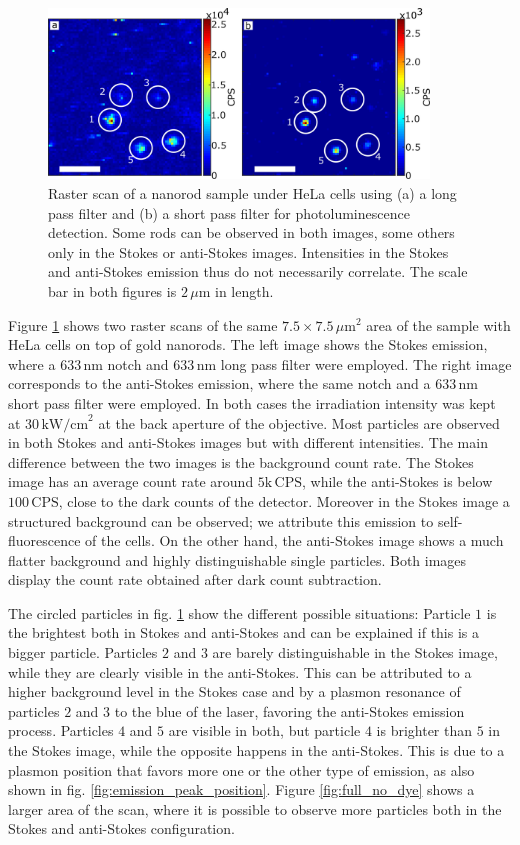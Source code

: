 \documentclass[journal=nalefd,manuscript=letter]{achemso}
\newcommand{\nm}{\ensuremath{\,\textrm{nm}}}
\newcommand{\um}{\ensuremath{\,\mu\textrm{m}}}
\newcommand{\pwr}{\ensuremath{\,\textrm{kW/cm}^2}}
\newcommand{\CPS}{\ensuremath{\,\textrm{CPS}}}
\begin{document}
\begin{figure}[htp] \centering
\includegraphics[width=0.9\textwidth]{Figures/04_Stokes_AS/stokes_as_no_dye.png}
\caption{Raster scan of a nanorod sample under HeLa cells using (a) a long pass
filter and (b) a short pass filter for photoluminescence detection.
Some rods can be observed in both images, some others only in the Stokes or
anti-Stokes images. Intensities in the Stokes and anti-Stokes emission thus do
not necessarily correlate. The scale bar in both figures is $2\um$ in length.}
	\label{fig:stokes_as_no_dye}
\end{figure}

Figure \ref{fig:stokes_as_no_dye} shows two raster scans of the same
$7.5\times7.5\um^2$ area of the sample with HeLa cells on top of gold nanorods.
The left image shows the Stokes emission, where a $633\nm$ notch and $633\nm$
long pass filter were employed. The right image corresponds to the anti-Stokes
emission, where the same notch and a $633\nm$ short pass filter were employed.
In both cases the irradiation intensity was kept at $30\pwr$ at the back
aperture of the objective. Most particles are observed in both Stokes and anti-Stokes images
but with different intensities. The main difference between the two images is
the background count rate. The Stokes image has an average count rate around
$5\textrm{k}\CPS$, while the anti-Stokes is below $100\CPS$, close to the dark
counts of the detector. Moreover in the Stokes image a structured background can
be observed; we attribute this emission to self-fluorescence of the cells. On
the other hand, the anti-Stokes image shows a much flatter background and highly
distinguishable single particles. Both images display the count rate
obtained after dark count subtraction.

The circled particles in fig. \ref{fig:stokes_as_no_dye} show the different
possible situations: Particle $1$ is the brightest both in Stokes and
anti-Stokes and can be explained if this is a bigger particle.
Particles $2$ and $3$ are barely distinguishable in the Stokes image, while they
are clearly visible in the anti-Stokes. This can be attributed to a higher
background level in the Stokes case and by a plasmon resonance of particles $2$
and $3$ to the blue of the laser, favoring the anti-Stokes emission process.
Particles $4$ and $5$ are visible in both, but particle $4$ is brighter than $5$
in the Stokes image, while the opposite happens in the anti-Stokes.
This is due to a plasmon position that favors more one or the other type of
emission, as also shown in fig. \ref{fig:emission_peak_position}. Figure
\ref{fig:full_no_dye} shows a larger area of the scan, where it is possible to
observe more particles both in the Stokes and anti-Stokes configuration.
\end{document}
